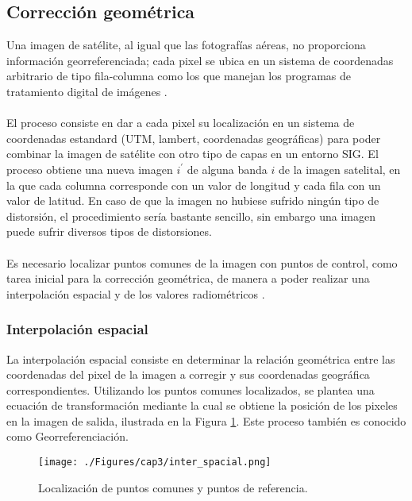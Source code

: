 \subsection{Correcci\'on geom\'etrica}\label{sec:corrGeometrica}
Una imagen de sat\'elite, al igual que las fotograf\'ias a\'ereas, no proporciona informaci\'on georreferenciada; cada pixel se ubica en un sistema de coordenadas arbitrario de tipo fila-columna como los que manejan los programas de tratamiento digital de im\'agenes \cite{deniseCultivos}.\\~\\
El proceso consiste en dar a cada pixel su localizaci\'on en un sistema de coordenadas estandard (UTM, lambert, coordenadas geogr\'aficas) para poder combinar la imagen de sat\'elite con otro tipo de capas en un entorno SIG. El proceso obtiene una nueva imagen $ i^{'} $ de alguna banda $ i $ de la imagen satelital, en la que cada columna corresponde con un valor de longitud y cada fila con un valor de latitud. En caso de que la imagen no hubiese sufrido ning\'un tipo de distorsi\'on, el procedimiento ser\'ia bastante sencillo, sin embargo una imagen puede sufrir diversos tipos de distorsiones.\\~\\
Es necesario localizar puntos comunes de la imagen con puntos de control, como tarea inicial para la correcci\'on geom\'etrica, de manera a poder realizar una interpolaci\'on espacial y de los valores radiom\'etricos \cite{deniseCultivos}.

\subsubsection{Interpolaci\'on espacial}
La interpolaci\'on espacial consiste en determinar la relaci\'on geom\'etrica entre las coordenadas del pixel de la imagen a corregir y sus coordenadas geogr\'afica correspondientes. Utilizando los puntos comunes localizados, se plantea una ecuaci\'on de transformaci\'on mediante la cual se obtiene la posici\'on de los pixeles en la imagen de salida, ilustrada en la Figura \ref{fig:intEspacial}. Este proceso tambi\'en es conocido como Georreferenciaci\'on.  
    \begin{figure}[H]
    	\centering
    	\texttt{[image: ./Figures/cap3/inter\_spacial.png]}
    	\caption{Localizaci\'on de puntos comunes y puntos de referencia.}
    	\label{fig:intEspacial}
    \end{figure}
    

